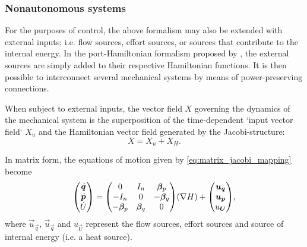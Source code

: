 \subsubsection{Nonautonomous systems}
For the purposes of control, the above formalism may also be extended with external inputs; i.e. flow sources, effort sources, or sources that contribute to the internal energy. In the port-Hamiltonian formalism proposed by \citet{VanDerSchaft2006}, the external sources are simply added to their respective Hamiltonian functions. It is then possible to interconnect several mechanical systems by means of power-preserving connections.

When subject to external inputs, the vector field \(X\) governing the dynamics of the mechanical system is the superposition of the time-dependent `input vector field` \(X_u\) and the Hamiltonian vector field generated by the Jacobi-structure:
\begin{equation}
    X = X_u + X_H.
\end{equation}

In matrix form, the equations of motion given by \cref{eq:matrix_jacobi_mapping} become
\begin{equation}
    \mqty(\dot{\vec{q}} \\ \dot{\vec{p}} \\ \dot{U}) = \mqty( 0 & I_n & \vec{\beta}_p \\  -I_n & 0 & -\vec{\beta}_q \\ -\vec{\beta}_p & \vec{\beta}_q & 0)(\nabla H)
    + \mqty(\vec{u}_\vec{q} \\\vec{u}_\vec{p} \\ u_\vec{U}),
\end{equation}
where \(\vec{u}_\vec{q}\), \(\vec{u}_\vec{q}\) and \(u_\vec{U}\) represent the flow sources, effort sources and source of internal energy (i.e. a heat source).





